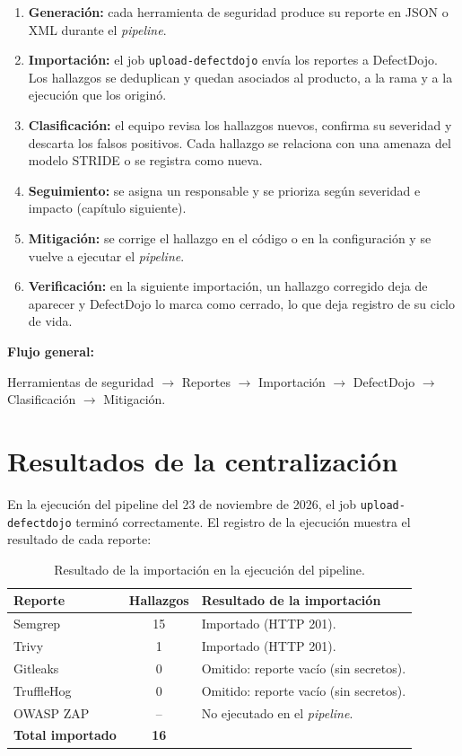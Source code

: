 \begin{enumerate}
    \item \textbf{Generación:} cada herramienta de seguridad produce su
    reporte en JSON o XML durante el \textit{pipeline}.
    \item \textbf{Importación:} el job \texttt{upload-defectdojo} envía los
    reportes a DefectDojo. Los hallazgos se deduplican y quedan asociados al
    producto, a la rama y a la ejecución que los originó.
    \item \textbf{Clasificación:} el equipo revisa los hallazgos nuevos,
    confirma su severidad y descarta los falsos positivos. Cada hallazgo se
    relaciona con una amenaza del modelo STRIDE o se registra como nueva.
    \item \textbf{Seguimiento:} se asigna un responsable y se prioriza según
    severidad e impacto (capítulo siguiente).
    \item \textbf{Mitigación:} se corrige el hallazgo en el código o en la
    configuración y se vuelve a ejecutar el \textit{pipeline}.
    \item \textbf{Verificación:} en la siguiente importación, un hallazgo
    corregido deja de aparecer y DefectDojo lo marca como cerrado, lo que
    deja registro de su ciclo de vida.
\end{enumerate}

\begin{infobox}
\textbf{Flujo general:}

Herramientas de seguridad $\rightarrow$
Reportes $\rightarrow$
Importación $\rightarrow$
DefectDojo $\rightarrow$
Clasificación $\rightarrow$
Mitigación.
\end{infobox}

\section{Resultados de la centralización}

En la ejecución del pipeline del 23 de noviembre de 2026, el job
\texttt{upload-defectdojo} terminó correctamente. El registro de la
ejecución muestra el resultado de cada reporte:

\begin{table}[H]
\centering
\caption{Resultado de la importación en la ejecución del pipeline.}
\label{tab:dojo-resultado}

\begin{tabularx}{\textwidth}{l c X}
\toprule
\textbf{Reporte} &
\textbf{Hallazgos} &
\textbf{Resultado de la importación} \\
\midrule
Semgrep & 15 & Importado (HTTP 201). \\
Trivy & 1 & Importado (HTTP 201). \\
Gitleaks & 0 & Omitido: reporte vacío (sin secretos). \\
TruffleHog & 0 & Omitido: reporte vacío (sin secretos). \\
OWASP ZAP & -- & No ejecutado en el \textit{pipeline}. \\
\midrule
\textbf{Total importado} & \textbf{16} & \\
\bottomrule
\end{tabularx}
\end{table}

